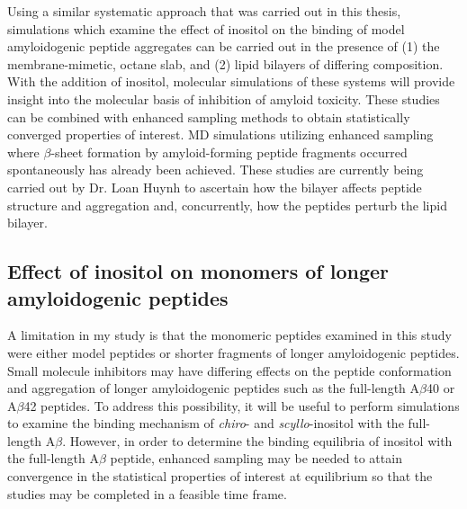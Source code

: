 Using a similar systematic approach that was carried out in this thesis, simulations which examine the effect of inositol on the binding of model amyloidogenic peptide aggregates can be carried out in the presence of (1) the membrane-mimetic, octane slab, and (2) lipid bilayers of differing composition. With the addition of inositol, molecular simulations of these systems will provide insight into the  molecular basis of inhibition of amyloid toxicity. These studies can be combined with enhanced sampling methods\cite{Rauscher:2009wr} to obtain statistically converged properties of interest.  MD simulations utilizing enhanced sampling where $\beta$-sheet formation by amyloid-forming peptide fragments occurred spontaneously has already been achieved.  These studies are currently being carried out by Dr. Loan Huynh to ascertain how the bilayer affects peptide structure and aggregation and, concurrently, how the peptides perturb the lipid bilayer.


\subsection{Effect of inositol on monomers of longer amyloidogenic peptides}
A limitation in my study is that the monomeric peptides examined in this study were either model peptides or shorter fragments of longer amyloidogenic peptides. Small molecule inhibitors may have differing effects on the peptide conformation and aggregation of longer amyloidogenic peptides such as the full-length A$\beta$40 or A$\beta$42 peptides. To address this possibility, it will be useful to perform simulations to examine the binding mechanism of \textit{chiro}- and \textit{scyllo}-inositol with the full-length A$\beta$. However, in order to determine the binding equilibria of inositol with  the full-length A$\beta$ peptide, enhanced sampling may be needed to attain convergence in the statistical properties of interest at equilibrium so that the studies may be completed in a feasible time frame.

